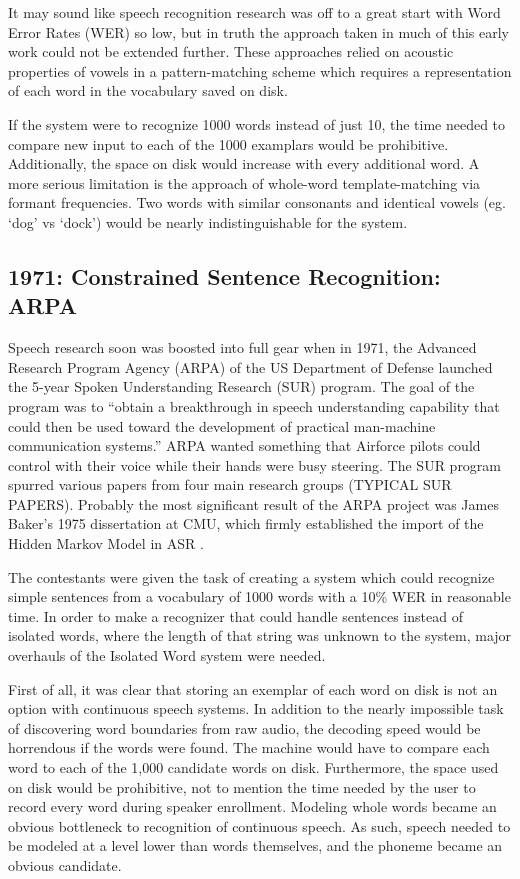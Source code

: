 \documentclass[10pt,a4paper]{article}
\begin{document}
It may sound like speech recognition research was off to a great start with Word Error Rates (WER) so low, but in truth the approach taken in much of this early work could not be extended further. These approaches relied on acoustic properties of vowels in a pattern-matching scheme which requires a representation of each word in the vocabulary saved on disk.

If the system were to recognize 1000 words instead of just 10, the time needed to compare new input to each of the 1000 examplars would be prohibitive. Additionally, the space on disk would increase with every additional word. A more serious limitation is the approach of whole-word template-matching via formant frequencies. Two words with similar consonants and identical vowels (eg. `dog' vs `dock') would be nearly indistinguishable for the system.

\subsection{1971: Constrained Sentence Recognition: ARPA}

 Speech research soon was boosted into full gear when in 1971, the Advanced Research Program Agency (ARPA) of the US Department of Defense launched the 5-year Spoken Understanding Research (SUR) program. The goal of the program was to ``obtain a breakthrough in speech understanding capability that could then be used toward the development of practical man-machine communication systems.'' \cite{klatt1977} ARPA wanted something that Airforce pilots could control with their voice while their hands were busy steering. The SUR program spurred various papers from four main research groups (TYPICAL SUR PAPERS). Probably the most significant result of the ARPA project was James Baker's 1975 dissertation at CMU, which firmly established the import of the Hidden Markov Model in ASR \cite{bakerDissertation1975}.


 The contestants were given the task of creating a system which could recognize simple sentences from a vocabulary of 1000 words with a 10\% WER in reasonable time. In order to make a recognizer that could handle sentences instead of isolated words, where the length of that string was unknown to the system, major overhauls of the Isolated Word system were needed.

First of all, it was clear that storing an exemplar of each word on disk is not an option with continuous speech systems. In addition to the nearly impossible task of discovering word boundaries from raw audio, the decoding speed would be horrendous if the words were found. The machine would have to compare each word to each of the 1,000 candidate words on disk. Furthermore, the space used on disk would be prohibitive, not to mention the time needed by the user to record every word during speaker enrollment. Modeling whole words became an obvious bottleneck to recognition of continuous speech. As such, speech needed to be modeled at a level lower than words themselves, and the phoneme became an obvious candidate.
\end{document}
